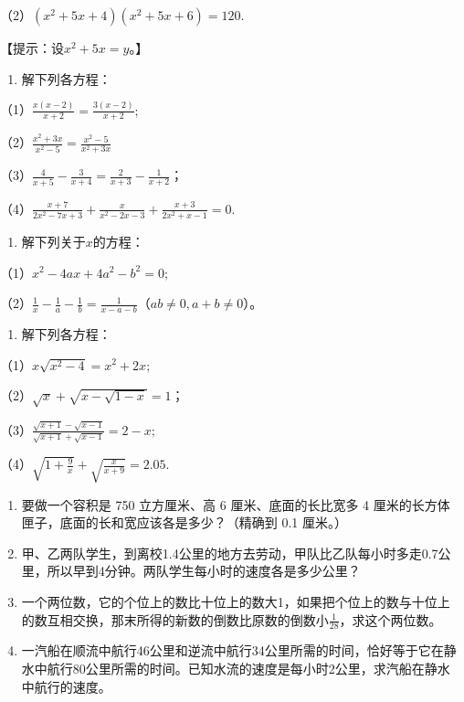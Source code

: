 （2）\((x^{2} + 5x + 4)(x^{2} + 5x + 6) = 120.\)

【提示：设\(x^{2} + 5x = y\)。】

\begin{enumerate}[start=8]
\item
  解下列各方程：
\end{enumerate}

（1）\(\frac{x(x - 2)}{x + 2} = \frac{3(x - 2)}{x + 2};\)

（2）\(\frac{x^2 + 3x}{x^2 - 5} = \frac{x^2 - 5}{x^2 + 3x}\)

（3）\(\frac{4}{x + 5} - \frac{3}{x + 4} = \frac{2}{x + 3} - \frac{1}{x + 2}\)；

（4）\(\frac{x + 7}{2x^2 - 7x + 3} + \frac{x}{x^2 - 2x - 3} + \frac{x + 3}{2x^2 + x - 1} = 0.\)

\begin{enumerate}[start=9]
\item
  解下列关于\(x\)的方程：
\end{enumerate}

（1）\(x^{2} - 4ax + 4a^{2} - b^{2} = 0;\)

（2）\(\frac{1}{x} - \frac{1}{a} - \frac{1}{b} = \frac{1}{x - a - b}\)（\(ab \neq 0, a + b \neq 0\)）。

\begin{enumerate}[start=10]
\item
  解下列各方程：
\end{enumerate}

（1）\(x\sqrt{x^2 - 4} = x^2 + 2x;\)

（2）\(\sqrt{x} + \sqrt{x - \sqrt{1 - x}} = 1\)；

（3）\(\frac{\sqrt{x + 1} - \sqrt{x - 1}}{\sqrt{x + 1} + \sqrt{x - 1}} = 2 - x;\)

（4）\(\sqrt{1 + \frac{9}{x}} + \sqrt{\frac{x}{x + 9}} = 2.05.\)

\begin{enumerate}[start=11]
\item
  要做一个容积是 750 立方厘米、高 6 厘米、底面的长比宽多 4
  厘米的长方体匣子，底面的长和宽应该各是多少？（精确到 0.1 厘米。）
\item
  甲、乙两队学生，到离校1.4公里的地方去劳动，甲队比乙队每小时多走0.7公里，所以早到4分钟。两队学生每小时的速度各是多少公里？
\item
  一个两位数，它的个位上的数比十位上的数大1，如果把个位上的数与十位上的数互相交换，那末所得的新数的倒数比原数的倒数小\(\frac{1}{28}\)，求这个两位数。
\item
  一汽船在顺流中航行46公里和逆流中航行34公里所需的时间，恰好等于它在静水中航行80公里所需的时间。已知水流的速度是每小时2公里，求汽船在静水中航行的速度。
\end{enumerate}

